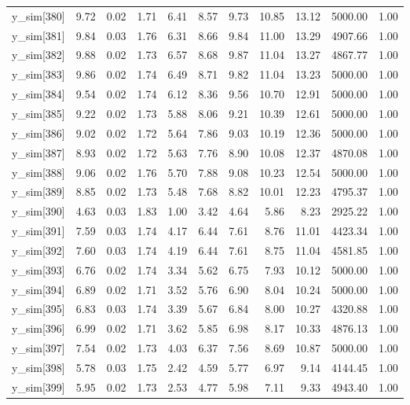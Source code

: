 \begin{table}[ht]
\begin{tabular}{rrrrrrrrrrr}
  y\_sim[380] & 9.72 & 0.02 & 1.71 & 6.41 & 8.57 & 9.73 & 10.85 & 13.12 & 5000.00 & 1.00 \\ 
  y\_sim[381] & 9.84 & 0.03 & 1.76 & 6.31 & 8.66 & 9.84 & 11.00 & 13.29 & 4907.66 & 1.00 \\ 
  y\_sim[382] & 9.88 & 0.02 & 1.73 & 6.57 & 8.68 & 9.87 & 11.04 & 13.27 & 4867.77 & 1.00 \\ 
  y\_sim[383] & 9.86 & 0.02 & 1.74 & 6.49 & 8.71 & 9.82 & 11.04 & 13.23 & 5000.00 & 1.00 \\ 
  y\_sim[384] & 9.54 & 0.02 & 1.74 & 6.12 & 8.36 & 9.56 & 10.70 & 12.91 & 5000.00 & 1.00 \\ 
  y\_sim[385] & 9.22 & 0.02 & 1.73 & 5.88 & 8.06 & 9.21 & 10.39 & 12.61 & 5000.00 & 1.00 \\ 
  y\_sim[386] & 9.02 & 0.02 & 1.72 & 5.64 & 7.86 & 9.03 & 10.19 & 12.36 & 5000.00 & 1.00 \\ 
  y\_sim[387] & 8.93 & 0.02 & 1.72 & 5.63 & 7.76 & 8.90 & 10.08 & 12.37 & 4870.08 & 1.00 \\ 
  y\_sim[388] & 9.06 & 0.02 & 1.76 & 5.70 & 7.88 & 9.08 & 10.23 & 12.54 & 5000.00 & 1.00 \\ 
  y\_sim[389] & 8.85 & 0.02 & 1.73 & 5.48 & 7.68 & 8.82 & 10.01 & 12.23 & 4795.37 & 1.00 \\ 
  y\_sim[390] & 4.63 & 0.03 & 1.83 & 1.00 & 3.42 & 4.64 & 5.86 & 8.23 & 2925.22 & 1.00 \\ 
  y\_sim[391] & 7.59 & 0.03 & 1.74 & 4.17 & 6.44 & 7.61 & 8.76 & 11.01 & 4423.34 & 1.00 \\ 
  y\_sim[392] & 7.60 & 0.03 & 1.74 & 4.19 & 6.44 & 7.61 & 8.75 & 11.04 & 4581.85 & 1.00 \\ 
  y\_sim[393] & 6.76 & 0.02 & 1.74 & 3.34 & 5.62 & 6.75 & 7.93 & 10.12 & 5000.00 & 1.00 \\ 
  y\_sim[394] & 6.89 & 0.02 & 1.71 & 3.52 & 5.76 & 6.90 & 8.04 & 10.24 & 5000.00 & 1.00 \\ 
  y\_sim[395] & 6.83 & 0.03 & 1.74 & 3.39 & 5.67 & 6.84 & 8.00 & 10.27 & 4320.88 & 1.00 \\ 
  y\_sim[396] & 6.99 & 0.02 & 1.71 & 3.62 & 5.85 & 6.98 & 8.17 & 10.33 & 4876.13 & 1.00 \\ 
  y\_sim[397] & 7.54 & 0.02 & 1.73 & 4.03 & 6.37 & 7.56 & 8.69 & 10.87 & 5000.00 & 1.00 \\ 
  y\_sim[398] & 5.78 & 0.03 & 1.75 & 2.42 & 4.59 & 5.77 & 6.97 & 9.14 & 4144.45 & 1.00 \\ 
  y\_sim[399] & 5.95 & 0.02 & 1.73 & 2.53 & 4.77 & 5.98 & 7.11 & 9.33 & 4943.40 & 1.00 \\ 

\end{tabular}
\end{table}
